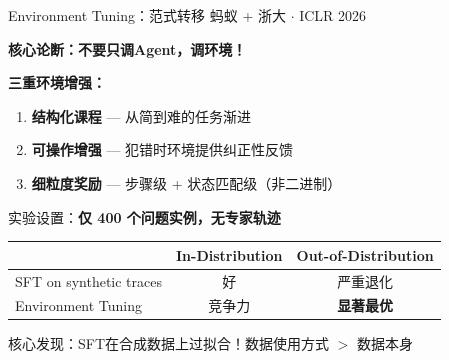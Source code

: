 \documentclass[aspectratio=169, 11pt]{beamer}
\begin{document}
\begin{frame}{Environment Tuning：范式转移}
{\small 蚂蚁 + 浙大 $\cdot$ ICLR 2026}

\vspace{4pt}
\textbf{核心论断：不要只调Agent，调环境！}

\vspace{6pt}
\textbf{三重环境增强：}
\begin{enumerate}
    \small
    \item \textbf{结构化课程} --- 从简到难的任务渐进
    \item \textbf{可操作增强} --- 犯错时环境提供纠正性反馈
    \item \textbf{细粒度奖励} --- 步骤级 + 状态匹配级（非二进制）
\end{enumerate}

\vspace{6pt}
实验设置：\textbf{仅 400 个问题实例，无专家轨迹}

\vspace{6pt}
\small
\begin{tabular}{lcc}
\toprule
 & In-Distribution & Out-of-Distribution \\
\midrule
SFT on synthetic traces & 好 & \color{accentred}严重退化 \\
Environment Tuning & 竞争力 & \color{successgreen}\textbf{显著最优} \\
\bottomrule
\end{tabular}

\vspace{8pt}
\begin{center}
\alert{核心发现：SFT在合成数据上过拟合！数据使用方式 $>$ 数据本身}
\end{center}
\end{frame}
\end{document}
